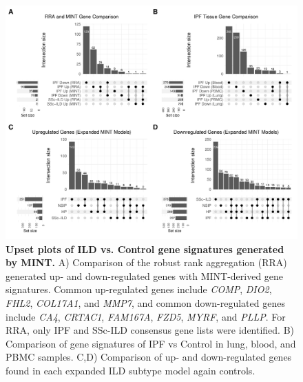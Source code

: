 \documentclass[
]{article}
\begin{document}
\begin{figure}

{\centering \includegraphics[width=1\linewidth,]{./Figures/SysReview/FigE3_upset} 

}

\caption[Upset plot of models]{\textbf{Upset plots of ILD vs. Control gene signatures generated by MINT.} A) Comparison of the robust rank aggregation (RRA) generated up- and down-regulated genes with MINT-derived gene signatures. Common up-regulated genes include \textit{COMP}, \textit{DIO2}, \textit{FHL2}, \textit{COL17A1}, and \textit{MMP7}, and common down-regulated genes include \textit{CA4}, \textit{CRTAC1}, \textit{FAM167A}, \textit{FZD5}, \textit{MYRF}, and \textit{PLLP}. For RRA, only IPF and SSc-ILD consensus gene lists were identified. B) Comparison of gene signatures of IPF vs Control in lung, blood, and PBMC samples. C,D) Comparison of up- and down-regulated genes found in each expanded ILD subtype model again controls.}\label{fig:modelUpset}
\end{figure}
\end{document}
